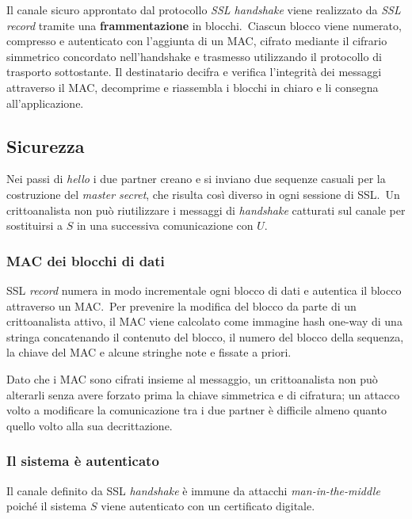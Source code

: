 Il canale sicuro approntato dal protocollo \textit{SSL handshake} viene realizzato da \textit{SSL record} tramite una \textbf{frammentazione}  in blocchi.\
Ciascun blocco viene numerato, compresso e autenticato con l'aggiunta di un MAC, cifrato mediante il  cifrario simmetrico concordato nell'handshake e trasmesso utilizzando il protocollo di trasporto sottostante.
Il destinatario decifra e verifica l'integrità dei messaggi attraverso il MAC, decomprime e riassembla i blocchi in chiaro e li consegna all'applicazione.

\subsection{Sicurezza}

Nei passi di \textit{hello} i due partner creano e si inviano due sequenze casuali per la costruzione del \textit{master secret}, che risulta così diverso in ogni sessione di SSL.\
Un crittoanalista non può riutilizzare i messaggi di \textit{handshake} catturati sul canale per sostituirsi a $S$ in una successiva comunicazione con $U$.\

\subsubsection{MAC dei blocchi di dati}

SSL \textit{record} numera in modo incrementale ogni blocco di dati e autentica il blocco attraverso un MAC.\
Per prevenire la modifica del blocco da parte di un crittoanalista attivo, il MAC viene calcolato come immagine hash one-way di una stringa concatenando il contenuto del blocco, il numero del blocco della sequenza, la chiave del MAC e alcune stringhe note e fissate a priori.\

Dato che i MAC sono cifrati insieme al messaggio, un crittoanalista non può alterarli senza avere forzato prima la chiave simmetrica e di cifratura; un attacco volto a modificare la comunicazione tra i due partner è difficile almeno quanto quello volto alla sua decrittazione.\

\subsubsection{Il sistema è autenticato}

Il canale definito da SSL \textit{handshake} è immune da attacchi \textit{man-in-the-middle} poiché il sistema $S$ viene autenticato con un certificato digitale.\

